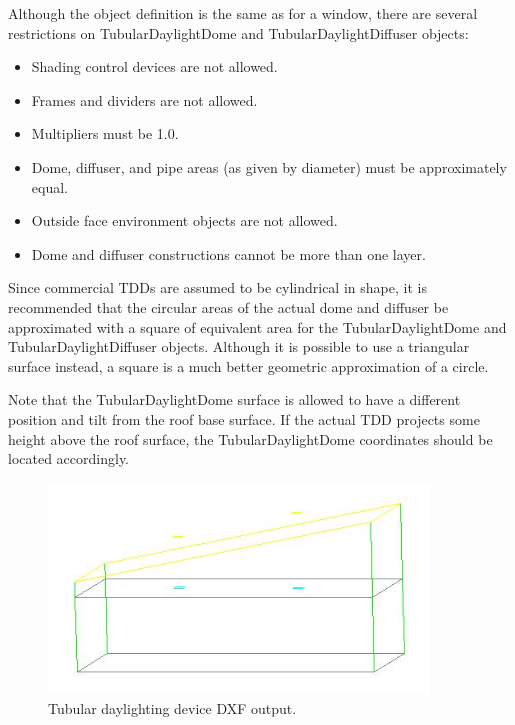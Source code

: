 Although the object definition is the same as for a window, there are several restrictions on TubularDaylightDome and TubularDaylightDiffuser objects:

\begin{itemize}
\item
  Shading control devices are not allowed.
\item
  Frames and dividers are not allowed.
\item
  Multipliers must be 1.0.
\item
  Dome, diffuser, and pipe areas (as given by diameter) must be approximately equal.
\item
  Outside face environment objects are not allowed.
\item
  Dome and diffuser constructions cannot be more than one layer.
\end{itemize}

Since commercial TDDs are assumed to be cylindrical in shape, it is recommended that the circular areas of the actual dome and diffuser be approximated with a square of equivalent area for the TubularDaylightDome and TubularDaylightDiffuser objects. Although it is possible to use a triangular surface instead, a square is a much better geometric approximation of a circle.

Note that the TubularDaylightDome surface is allowed to have a different position and tilt from the roof base surface. If the actual TDD projects some height above the roof surface, the TubularDaylightDome coordinates should be located accordingly.

\begin{figure}[hbtp] %
\centering
\includegraphics[width=0.9\textwidth, height=0.9\textheight, keepaspectratio=true]{media/image109.png}
\caption{Tubular daylighting device DXF output. \protect \label{fig:tubular-daylighting-device-dxf-output.}}
\end{figure}

